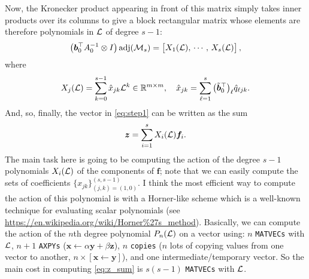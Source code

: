 \documentclass[review]{siamart}
\newcommand{\madj}{\operatorname{adj}}
\begin{document}
Now, the Kronecker product appearing in front of this matrix simply takes inner products over its columns to give a block rectangular matrix whose elements are therefore polynomials in ${\cal L}$ of degree $s-1$:
\begin{align}
\big( \bm{b}_0^\top A^{-1}_0 \otimes I \big) \madj({\cal M}_s) 
=
\begin{bmatrix}
X_{1}({\cal L}), \, \cdots, \, X_{s}({\cal L})
\end{bmatrix},
\end{align}
where
\begin{align}
X_{j}({\cal L}) = \sum \limits_{k = 0}^{s-1} \hat{x}_{j k} {\cal L}^k \in \mathbb{R}^{m \times m}, 
\quad
\hat{x}_{j k} = \sum \limits_{\ell = 1}^s \big( \tilde{\bm{b}}_0^\top \big)_{\ell} \hat{q}_{\ell j k}.
\end{align}
And, so, finally, the vector in \eqref{eq:step1} can be written as the sum
\begin{align} \label{eq:z_sum}
\bm{z} = \sum \limits_{i = 1}^s X_i({\cal L}) \bm{f}_i.
\end{align}
The main task here is going to be computing the action of the degree $s-1$ polynomials $X_i({\cal L})$ of the components of $\bm{f}$; note that we can  easily compute the sets of coefficients $\{ x_{jk} \}_{(j,k)=(1,0)}^{(s,s-1)}$. I think the most efficient way to compute the action of this polynomial is with a Horner-like scheme which is a well-known technique for evaluating scalar polynomials (see \url{https://en.wikipedia.org/wiki/Horner\%27s_method}). Basically, we can compute the action of the $n$th degree polynomial $P_n({\cal L})$ on a vector using: $n$ \texttt{MATVECs} with ${\cal L}$, $n+1$ \texttt{AXPYs} ($\bm{x} \gets \alpha \bm{y} + \beta \bm{z}$), $n$ \texttt{copies} ($n$ lots of copying values from one vector to another, $n \times [\bm{x} \gets \bm{y}]$), and one intermediate/temporary vector. So the main cost in computing \eqref{eq:z_sum} is $s(s-1)$ \texttt{MATVECs} with ${\cal L}$.



% 
% 
\end{document}
